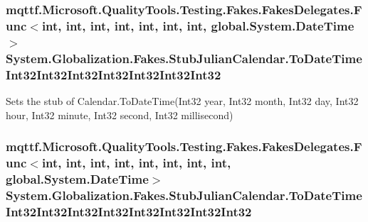 \hypertarget{class_system_1_1_globalization_1_1_fakes_1_1_stub_julian_calendar_a9d7ebb41f6bb0c91a423e6f53a59c442}{
\subsubsection[{To\-Date\-Time\-Int32\-Int32\-Int32\-Int32\-Int32\-Int32\-Int32}]{\setlength{\rightskip}{0pt plus 5cm}mqttf.\-Microsoft.\-Quality\-Tools.\-Testing.\-Fakes.\-Fakes\-Delegates.\-Func$<$int, int, int, int, int, int, int, global.\-System.\-Date\-Time$>$ System.\-Globalization.\-Fakes.\-Stub\-Julian\-Calendar.\-To\-Date\-Time\-Int32\-Int32\-Int32\-Int32\-Int32\-Int32\-Int32}}\label{class_system_1_1_globalization_1_1_fakes_1_1_stub_julian_calendar_a9d7ebb41f6bb0c91a423e6f53a59c442}


Sets the stub of Calendar.\-To\-Date\-Time(\-Int32 year, Int32 month, Int32 day, Int32 hour, Int32 minute, Int32 second, Int32 millisecond)

\hypertarget{class_system_1_1_globalization_1_1_fakes_1_1_stub_julian_calendar_aa038a076d1e2ced0638745344701807b}{
\subsubsection[{To\-Date\-Time\-Int32\-Int32\-Int32\-Int32\-Int32\-Int32\-Int32\-Int32}]{\setlength{\rightskip}{0pt plus 5cm}mqttf.\-Microsoft.\-Quality\-Tools.\-Testing.\-Fakes.\-Fakes\-Delegates.\-Func$<$int, int, int, int, int, int, int, int, global.\-System.\-Date\-Time$>$ System.\-Globalization.\-Fakes.\-Stub\-Julian\-Calendar.\-To\-Date\-Time\-Int32\-Int32\-Int32\-Int32\-Int32\-Int32\-Int32\-Int32}}\label{class_system_1_1_globalization_1_1_fakes_1_1_stub_julian_calendar_aa038a076d1e2ced0638745344701807b}


